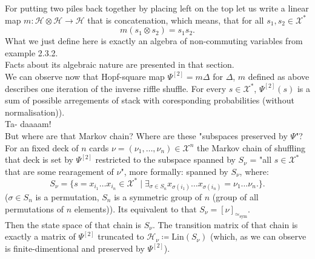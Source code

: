 \documentclass[a4paper, 12pt]{report}
\newcommand{\SimeqSym}{{\simeq_\mathrm{sym}}}
\begin{document}
For putting two piles back together by placing left on the top let us write a linear map
$m : \mathcal{H} \otimes \mathcal{H} \to \mathcal{H}$ that is concatenation, which means, that
for all $s_1, s_2 \in \mathcal{X}^*$
\begin{equation*}
m(s_1 \otimes s_2) = s_1s_2.
\end{equation*}
What we just define here is exactly an algebra of non-commuting variables from example
2.3.2.\\
Facts about its algebraic nature are presented in that section. \\
We can observe now that Hopf-square map $\Psi^{[2]} = m\Delta$ for $\Delta$, $m$ defined as above
describes one iteration of the inverse riffle shuffle. For every $s \in \mathcal{X}^*$, $\Psi^{[2]}(s)$ is
a sum of possible arregements of stack with coresponding probabilities (without normalisation)).
\\ Ta- daaaam! \\[4pt]
But where are that Markov chain? Where are these "subspaces preserved by $\Psi$"? \\
For an fixed deck of $n$ cards $\nu = (\nu_1, \dots, \nu_n) \in \mathcal{X}^n$ the Markov chain of shuffling
that deck is set by $\Psi^{[2]}$ restricted to the subspace spanned by $S_\nu$ = "all $s \in \mathcal{X}^*$
that are some rearagement of $\nu$", more formally: spanned by $S_\nu$, where:
\begin{equation*}
S_\nu = \{ s = x_{i_1}\dots x_{i_n} \in \mathcal{X}^* \mid
\exists_{\sigma \in S_n} x_{\sigma(i_1)}\dots x_{\sigma(i_n)} = \nu_1\dots \nu_n. \}.
\end{equation*}
($\sigma \in S_n$ is a permutation, $S_n$ is a symmetric group of $n$ (group of
all permutations of $n$ elements)). Its equivalent to that $S_\nu = [\nu]_\SimeqSym$.\\
Then the state space of that chain is $S_\nu$. The transition matrix of that chain is exactly a matrix of
$\Psi^{[2]}$ truncated to $\mathcal{H}_\nu \coloneqq \mathrm{Lin}(S_\nu)$
(which, as we can observe is finite-dimentional and preserved by $\Psi^{[2]}$). \\[8pt]
\end{document}
